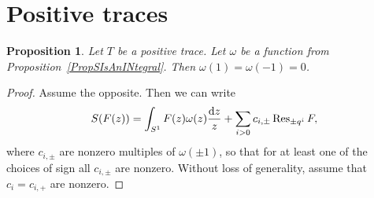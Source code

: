 \documentclass[pdftex]{sigma}
\numberwithin{equation}{section}
\newtheorem{Proposition}[Theorem]{Proposition}
\theoremstyle{definition}
\begin{document}
\section{Positive traces}
\label{SecPositiveTraces}
\begin{Proposition}
\label{PropWHasZeroesAtPlusMinusOne}
 Let $T$ be a positive trace. Let $\omega$ be a function from Proposition~{\rm\ref{PropSIsAnINtegral}}. Then $\omega(1)=\omega(-1)=0$.
\end{Proposition}
\begin{proof}
 Assume the opposite. Then we can write
 \[S(F(z))=\int_{S^1}F(z)\omega(z)\frac{{\rm d}z}{z}+\sum_{i>0} c_{i,\pm}\operatorname{Res}_{\pm q^i}F,\] where $c_{i,\pm}$ are nonzero multiples of $\omega(\pm 1)$, so that for at least one of the choices of sign all $c_{i,\pm}$ are nonzero. Without loss of generality, assume that $c_i=c_{i,+}$ are nonzero.


\end{proof}
\end{document}

